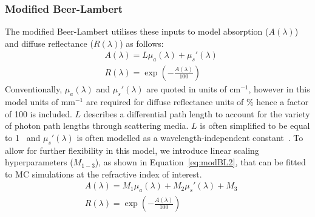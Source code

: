 \subsubsection{Modified Beer-Lambert}
The modified Beer-Lambert utilises these inputs to model absorption ($A(\lambda)$) and diffuse reflectance ($R(\lambda)$) as follows: 
\begin{equation}
\begin{aligned}
    & A(\lambda) = L\mu_a(\lambda) + \mu_s'(\lambda) \\
    & R(\lambda) = \exp{\left(-\frac{A(\lambda)}{100}\right)}
\end{aligned}
\label{eq:modBL1}
\end{equation}
Conventionally, $\mu_a(\lambda)$ and $\mu_s'(\lambda)$ are quoted in units of cm\textrm{$^{-1}$}, however in this model units of mm\textrm{$^{-1}$} are required for diffuse reflectance units of \% hence a factor of 100 is included. $L$ describes a differential path length to account for the variety of photon path lengths through scattering media. $L$ is often simplified to be equal to 1~\citep{Clancy2015} and $\mu_s'(\lambda)$ is often modelled as a wavelength-independent constant~\citep{Clancy2015, Ma2016}. 
To allow for further flexibility in this model,
we introduce linear scaling hyperparameters ($M_{1-3}$), as shown in Equation~\eqref{eq:modBL2}, that can be fitted to MC simulations at the refractive index of interest. 
\begin{equation}
\begin{aligned}
    & A(\lambda) = M_1\mu_a(\lambda) + M_2\mu_s'(\lambda) + M_3 \\
    & R(\lambda) = \exp{\left(-\frac{A(\lambda)}{100}\right)}
\end{aligned}
\label{eq:modBL2}
\end{equation}

